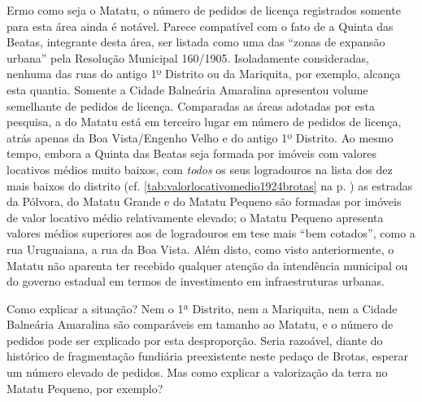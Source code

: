 
Ermo como seja o Matatu, o número de pedidos de licença registrados somente para esta área ainda é notável. Parece compatível com o fato de a Quinta das Beatas, integrante desta área, ser listada como uma das ``zonas de expansão urbana'' pela Resolução Municipal 160/1905. Isoladamente consideradas, nenhuma das ruas do antigo 1º Distrito ou da Mariquita, por exemplo, alcança esta quantia. Somente a Cidade Balneária Amaralina apresentou volume semelhante de pedidos de licença. Comparadas as áreas adotadas por esta pesquisa, a do Matatu está em terceiro lugar em número de pedidos de licença, atrás apenas da Boa Vista/Engenho Velho e do antigo 1º Distrito. Ao mesmo tempo, embora a Quinta das Beatas seja formada por imóveis com valores locativos médios muito baixos, com \textit{todos} os seus logradouros na lista dos dez mais baixos do distrito (cf. \autoref{tab:valorlocativomedio1924brotas} na p. \pageref{tab:valorlocativomedio1924brotas}) as estradas da Pólvora, do Matatu Grande e do Matatu Pequeno são formadas por imóveis de valor locativo médio relativamente elevado; o Matatu Pequeno apresenta valores médios superiores aos de logradouros em tese mais ``bem cotados'', como a rua Uruguaiana, a rua da Boa Vista. Além disto, como visto anteriormente, o Matatu não aparenta ter recebido qualquer atenção da intendência municipal ou do governo estadual em termos de investimento em infraestruturas urbanas.

Como explicar a situação? Nem o 1ª Distrito, nem a Mariquita, nem a Cidade Balneária Amaralina são comparáveis em tamanho ao Matatu, e o número de pedidos pode ser explicado por esta desproporção. Seria razoável, diante do histórico de fragmentação fundiária preexistente neste pedaço de Brotas, esperar um número elevado de pedidos. Mas como explicar a valorização da terra no Matatu Pequeno, por exemplo? 

